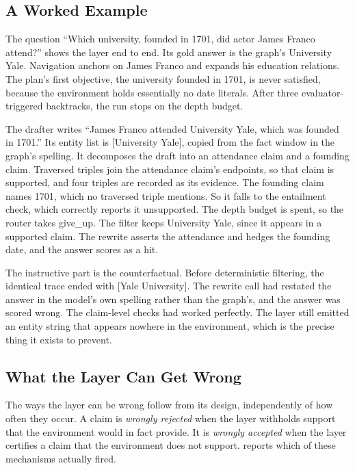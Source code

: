 \subsection{A Worked Example}\label{sec:example}

The question ``Which university, founded in 1701, did actor James Franco
attend?'' shows the layer end to end. Its gold answer is the graph's
\textsf{University Yale}. Navigation anchors on James Franco and expands his
education relations. The plan's first objective, the university founded in 1701,
is never satisfied, because the environment holds essentially no date literals.
After three evaluator-triggered backtracks, the run stops on the depth budget.

The drafter writes ``James Franco attended University Yale, which was founded in
1701.'' Its entity list is \textsf{[University Yale]}, copied from the fact
window in the graph's spelling. It decomposes the draft into an attendance claim
and a founding claim. Traversed triples join the attendance claim's endpoints,
so that claim is supported, and four triples are recorded as its evidence. The
founding claim names \textsf{1701}, which no traversed triple mentions. So it
falls to the entailment check, which correctly reports it unsupported. The depth
budget is spent, so the router takes \textsf{give\_up}. The filter keeps
\textsf{University Yale}, since it appears in a supported claim. The rewrite
asserts the attendance and hedges the founding date, and the answer scores as a
hit.

The instructive part is the counterfactual. Before deterministic filtering, the
identical trace ended with \textsf{[Yale University]}. The rewrite call had
restated the answer in the model's own spelling rather than the graph's, and the
answer was scored wrong. The claim-level checks had worked perfectly. The layer
still emitted an entity string that appears nowhere in the environment, which is
the precise thing it exists to prevent.

\subsection{What the Layer Can Get Wrong}\label{sec:failure-modes}

The ways the layer can be wrong follow from its design, independently of how
often they occur. A claim is \emph{wrongly rejected} when the layer withholds
support that the environment would in fact provide. It is \emph{wrongly
accepted} when the layer certifies a claim that the environment does not
support.  reports which of these mechanisms actually fired.

